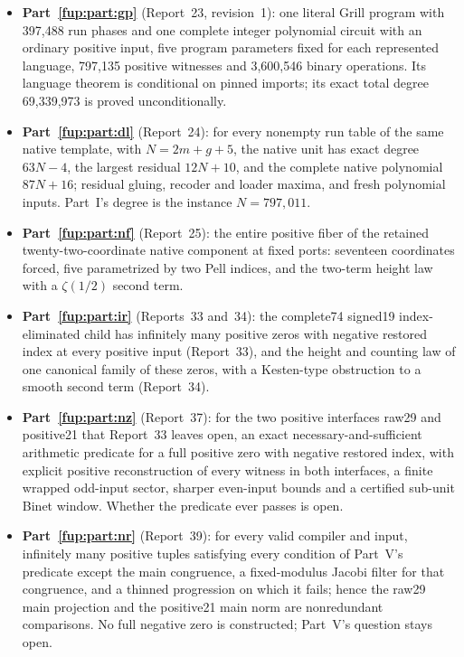 \documentclass[11pt,letterpaper]{article}
\theoremstyle{definition}\newtheorem{definition}[theorem]{Definition}
\theoremstyle{remark}\newtheorem{remark}[theorem]{Remark}
\begin{document}
\begin{itemize}
\item \textbf{Part~\ref{fup:part:gp}} (Report~23, revision~1): one literal Grill program with 397,488 run phases and one complete integer polynomial circuit with an ordinary positive input, five program parameters fixed for each represented language, 797,135 positive witnesses and 3,600,546 binary operations. Its language theorem is conditional on pinned imports; its exact total degree 69,339,973 is proved unconditionally.
\item \textbf{Part~\ref{fup:part:dl}} (Report~24): for every nonempty run table of the same native template, with $N=2m+g+5$, the native unit has exact degree $63N-4$, the largest residual $12N+10$, and the complete native polynomial $87N+16$; residual gluing, recoder and loader maxima, and fresh polynomial inputs. Part~I's degree is the instance $N=797{,}011$.
\item \textbf{Part~\ref{fup:part:nf}} (Report~25): the entire positive fiber of the retained twenty-two-coordinate native component at fixed ports: seventeen coordinates forced, five parametrized by two Pell indices, and the two-term height law with a $\zeta(1/2)$ second term.
\item \textbf{Part~\ref{fup:part:ir}} (Reports~33 and~34): the complete74 signed19 index-eliminated child has infinitely many positive zeros with negative restored index at every positive input (Report~33), and the height and counting law of one canonical family of these zeros, with a Kesten-type obstruction to a smooth second term (Report~34).
\item \textbf{Part~\ref{fup:part:nz}} (Report~37): for the two positive interfaces raw29 and positive21 that Report~33 leaves open, an exact necessary-and-sufficient arithmetic predicate for a full positive zero with negative restored index, with explicit positive reconstruction of every witness in both interfaces, a finite wrapped odd-input sector, sharper even-input bounds and a certified sub-unit Binet window. Whether the predicate ever passes is open.
\item \textbf{Part~\ref{fup:part:nr}} (Report~39): for every valid compiler and input, infinitely many positive tuples satisfying every condition of Part~V's predicate except the main congruence, a fixed-modulus Jacobi filter for that congruence, and a thinned progression on which it fails; hence the raw29 main projection and the positive21 main norm are nonredundant comparisons. No full negative zero is constructed; Part~V's question stays open.

\end{itemize}
\end{document}
